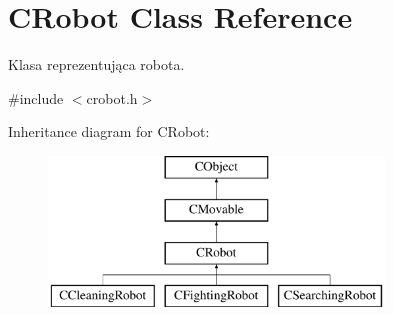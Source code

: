 \hypertarget{class_c_robot}{}\section{C\+Robot Class Reference}
\label{class_c_robot}


Klasa reprezentująca robota.  




{\ttfamily \#include $<$crobot.\+h$>$}

Inheritance diagram for C\+Robot\+:\begin{figure}[H]
\begin{center}
\leavevmode
\includegraphics[height=4.000000cm]{class_c_robot}
\end{center}
\end{figure}
